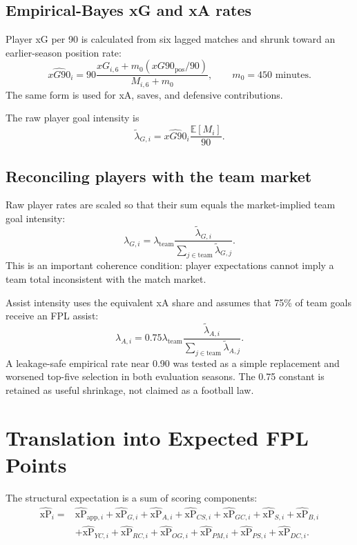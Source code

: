 \documentclass[11pt,a4paper]{article}
\newcommand{\xp}{\widehat{\mathrm{xP}}}
\newcommand{\E}{\mathbb{E}}
\begin{document}
\subsection{Empirical-Bayes xG and xA rates}

Player xG per 90 is calculated from six lagged matches and shrunk toward an earlier-season position rate:
\begin{equation}
  \widehat{xG90}_i=
  90\frac{xG_{i,6}+m_0(xG90_{\text{pos}}/90)}{M_{i,6}+m_0},
  \qquad m_0=450\text{ minutes}.
\end{equation}
The same form is used for xA, saves, and defensive contributions.

The raw player goal intensity is
\begin{equation}
  \widetilde\lambda_{G,i}=\widehat{xG90}_i\frac{\E[M_i]}{90}.
\end{equation}

\subsection{Reconciling players with the team market}

Raw player rates are scaled so that their sum equals the market-implied team goal intensity:
\begin{equation}
  \lambda_{G,i}=\lambda_{\text{team}}
  \frac{\widetilde\lambda_{G,i}}{\sum_{j\in\text{team}}\widetilde\lambda_{G,j}}.
\end{equation}
This is an important coherence condition: player expectations cannot imply a team total inconsistent with the match market.

Assist intensity uses the equivalent xA share and assumes that 75\% of team goals receive an FPL assist:
\begin{equation}
  \lambda_{A,i}=0.75\lambda_{\text{team}}
  \frac{\widetilde\lambda_{A,i}}{\sum_{j\in\text{team}}\widetilde\lambda_{A,j}}.
\end{equation}
A leakage-safe empirical rate near 0.90 was tested as a simple replacement and worsened top-five selection in both evaluation seasons. The 0.75 constant is retained as useful shrinkage, not claimed as a football law.

\section{Translation into Expected FPL Points}

The structural expectation is a sum of scoring components:
\begin{align}
  \xp_i={}&\xp_{\text{app},i}+\xp_{G,i}+\xp_{A,i}+\xp_{CS,i}
  +\xp_{GC,i}+\xp_{S,i}+\xp_{B,i}\\
  &+\xp_{YC,i}+\xp_{RC,i}+\xp_{OG,i}+\xp_{PM,i}
  +\xp_{PS,i}+\xp_{DC,i}.
\end{align}
\end{document}
